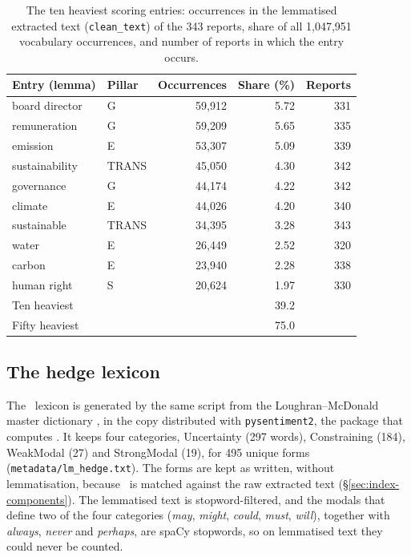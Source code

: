 \begin{table}[tbp]
\centering
\caption{The ten heaviest scoring entries: occurrences in the lemmatised
extracted text (\texttt{clean\_text}) of the 343 reports, share of all
1,047,951 vocabulary occurrences, and number of reports in which the entry
occurs.}
\label{tab:lexicon-mass}
\begin{tabular}{llrrr}
\toprule
Entry (lemma) & Pillar & Occurrences & Share (\%) & Reports \\
\midrule
board director & G & 59,912 & 5.72 & 331 \\
remuneration & G & 59,209 & 5.65 & 335 \\
emission & E & 53,307 & 5.09 & 339 \\
sustainability & TRANS & 45,050 & 4.30 & 342 \\
governance & G & 44,174 & 4.22 & 342 \\
climate & E & 44,026 & 4.20 & 340 \\
sustainable & TRANS & 34,395 & 3.28 & 343 \\
water & E & 26,449 & 2.52 & 320 \\
carbon & E & 23,940 & 2.28 & 338 \\
human right & S & 20,624 & 1.97 & 330 \\
\midrule
Ten heaviest & & & 39.2 & \\
Fifty heaviest & & & 75.0 & \\
\bottomrule
\end{tabular}
\end{table}

\subsection{The hedge lexicon}
\label{sec:lexicon-hedge}

The \HEDGE\ lexicon is generated by the same script from the Loughran--McDonald
master dictionary \citep{loughran2011}, in the copy distributed with
\texttt{pysentiment2}, the package that computes \SEN. It keeps four
categories, Uncertainty (297 words), Constraining (184), WeakModal (27) and
StrongModal (19), for 495 unique forms (\nolinkurl{metadata/lm_hedge.txt}).
The forms are kept as written, without lemmatisation, because \HEDGE\ is
matched against the raw extracted text (\S\ref{sec:index-components}). The
lemmatised text is stopword-filtered, and the modals that define two of the
four categories (\emph{may}, \emph{might}, \emph{could}, \emph{must},
\emph{will}), together with \emph{always}, \emph{never} and \emph{perhaps}, are
spaCy stopwords, so on lemmatised text they could never be counted.

